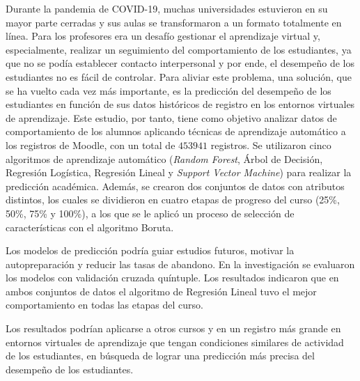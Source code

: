 \begin{resumen}
	Durante la pandemia de COVID-19, muchas universidades estuvieron en su mayor parte cerradas y sus aulas se transformaron 
	a un formato totalmente en línea. Para los profesores era un desafío gestionar el aprendizaje virtual y, especialmente, realizar 
	un seguimiento del comportamiento de los estudiantes, ya que no se podía establecer contacto interpersonal y por ende, el desempeño de los estudiantes no es fácil de controlar. Para aliviar 
	este problema, una solución, que se ha vuelto cada vez más importante, es la predicción del desempeño de los estudiantes en función 
	de sus datos históricos de registro en los entornos virtuales de aprendizaje. Este estudio, por tanto, tiene como objetivo analizar datos de comportamiento de los alumnos aplicando técnicas de aprendizaje automático a los registros de Moodle, con un total de $453941$ registros. Se utilizaron cinco algoritmos de aprendizaje automático 
	(\textit{Random Forest}, Árbol de Decisión, Regresión Logística, Regresión Lineal y \textit{Support Vector Machine}) para realizar la predicción académica. Además, se crearon dos conjuntos de datos con atributos distintos, los cuales se dividieron en cuatro etapas de progreso del curso 
	(25\%, 50\%, 75\% y 100\%), a los que se le aplicó un proceso de selección de características con el algoritmo Boruta.  

	Los modelos de predicción podría guiar estudios futuros, motivar la autopreparación y reducir las tasas de abandono. 
	En la investigación se evaluaron los modelos con validación cruzada quíntuple. Los resultados indicaron que en ambos conjuntos de datos el algoritmo de Regresión Lineal tuvo el mejor comportamiento en todas las etapas del curso.  

	Los resultados podrían aplicarse a otros cursos y en un registro más grande en entornos virtuales de aprendizaje que tengan condiciones similares de actividad de los estudiantes, en búsqueda de lograr una predicción más precisa del desempeño de los estudiantes.
\end{resumen}

